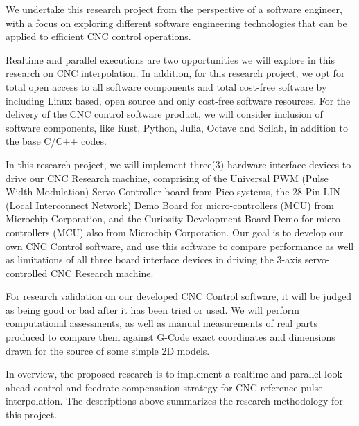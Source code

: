 We undertake this research project from the perspective of a software engineer, with a focus on exploring different software engineering technologies that can be applied to efficient CNC control operations.
\vspace{0.5cm}

Realtime and parallel executions are two opportunities we will explore in this research on CNC interpolation. In addition, for this research project, we opt for total open access to all software components and total cost-free software by including Linux based, open source and only cost-free software resources. For the delivery of the CNC control software product, we will consider inclusion of software components, like Rust, Python, Julia, Octave and Scilab, in addition to the base C/C++ codes.
\vspace{0.5cm}

In this research project, we will implement three(3) hardware interface devices to drive our CNC Research machine, comprising of the Universal PWM (Pulse Width Modulation) Servo Controller board from Pico systems, the 28-Pin LIN (Local Interconnect Network) Demo Board for micro-controllers (MCU) from Microchip Corporation, and the Curiosity Development Board Demo for micro-controllers (MCU) also from Microchip Corporation. Our goal is to develop our own CNC Control software, and use this software to compare performance as well as limitations of all three board interface devices in driving the 3-axis servo-controlled CNC Research machine.
\vspace{0.5cm}

For research validation on our developed CNC Control software, it will be judged as being good or bad after it has been tried or used. We will perform computational assessments, as well as manual measurements of real parts produced to compare them against G-Code exact coordinates and dimensions drawn for the source of some simple 2D models. 
\vspace{0.5cm}

In overview, the proposed research is to implement a realtime and parallel look-ahead control and feedrate compensation strategy for CNC reference-pulse interpolation. The descriptions above summarizes the research methodology for this project.

